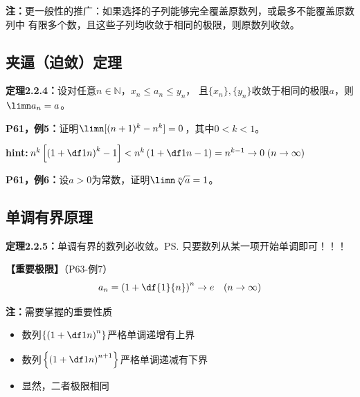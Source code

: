 {\bf 注：}更一般性的推广：如果选择的子列能够完全覆盖原数列，或最多不能覆盖原数列中
有限多个数，且这些子列均收敛于相同的极限，则原数列收敛。

\subsection{夹逼（迫敛）定理}

{\bf 定理2.2.4：}设对任意$n\in\mathbb{N}$，$x_n\le a_n\le y_n$，
且$\{x_n\},\{y_n\}$收敛于相同的极限$a$，则$\limn a_n=a$。

\begin{center}
\end{center}

{\bf P61，例5：}证明$\limn [(n+1)^k-{n}^k]=0$，其中$0<k<1$。

{\bf hint:}$n^k\left[\left(1+\df1n\right)^k-1\right]
<n^k\left(1+\df1n-1\right)=n^{k-1}\to 0\;(n\to\infty)$

{\bf P61，例6：}设$a>0$为常数，证明$\limn \sqrt[n]{a}=1$。

\subsection{单调有界原理}

{\bf 定理2.2.5：}单调有界的数列必收敛。\ps{只要数列从某一项开始单调即可！！！}

{\bf 【重要极限】}（P63-例7）
$$a_n=\left(1+\df{1}{n}\right)^n\to e\quad (n\to\infty)$$

{\bf 注：}需要掌握的重要性质
\begin{itemize}
  \setlength{\itemindent}{1cm}
  \item 数列$\left\{\left(1+\df 1n\right)^n\right\}$严格单调递增有上界
  \item 数列$\left\{\left(1+\df 1n\right)^{n+1}\right\}$严格单调递减有下界
  \item 显然，二者极限相同
\end{itemize}


